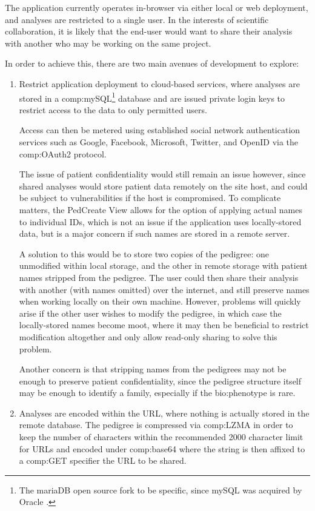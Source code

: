 The application currently operates in-browser via either local or web deployment, and analyses are restricted to a single user. In the interests of scientific collaboration, it is likely that the end-user would want to share their analysis with another who may be working on the same project.

In order to achieve this, there are two main avenues of development to explore:
\begin{enumerate}
\item{Restrict application deployment to cloud-based services, where analyses are stored in a \gls{comp:mySQL}\footnote{The mariaDB open source fork to be specific, since mySQL was acquired by Oracle \cite{oraclemysql}.} database and are issued private login keys to restrict access to the data to only permitted users.

Access can then be metered using established social network authentication services such as Google, Facebook, Microsoft, Twitter, and OpenID via the \gls{comp:OAuth2} \cite{hardt2012oauth} protocol.

\enlargethispage{\baselineskip}
The issue of patient confidentiality would still remain an issue however, since shared analyses would store patient data remotely on the site host, and could be subject to vulnerabilities if the host is compromised.  To complicate matters, the PedCreate View allows for the option of applying actual names to individual IDs, which is not an issue if the application uses locally-stored data, but is a major concern if such names are stored in a remote server.

A solution to this would be to store two copies of the pedigree: one unmodified within local storage, and the other in remote storage with patient names stripped from the pedigree. The user could then share their analysis with another (with names omitted) over the internet, and still preserve names when working locally on their own machine. However, problems will quickly arise if the other user wishes to modify the pedigree, in which case the locally-stored names become moot, where it may then be beneficial to restrict modification altogether and only allow read-only sharing to solve this problem.

Another concern is that stripping names from the pedigrees may not be enough to preserve patient confidentiality, since the pedigree structure itself may be enough to identify a family, especially if the \gls{bio:phenotype} is rare.
}
\item{Analyses are encoded within the URL, where nothing is actually stored in the remote database. The pedigree is compressed via \gls{comp:LZMA} \cite{lzma} in order to keep the number of characters within the recommended 2000 character limit for URLs \cite{urllength} and encoded under \gls{comp:base64} where the string is then affixed to a \gls{comp:GET} specifier the URL to be shared.

}
\end{enumerate}
